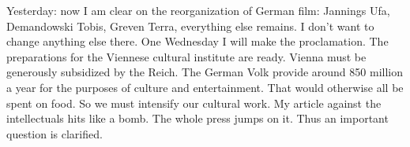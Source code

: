 Yesterday: now I am clear on the reorganization of German film: Jannings Ufa, Demandowski Tobis, Greven Terra, everything else remains. I don't want to change anything else there. One Wednesday I will make the proclamation. The preparations for the Viennese cultural institute are ready. Vienna must be generously subsidized by the Reich.  The German Volk provide around 850 million a year for the purposes of culture and entertainment. That would otherwise all be spent on food. So we must intensify our cultural work. My article against the intellectuals hits like a bomb. The whole press jumps on it. Thus an important question is clarified. \missing
